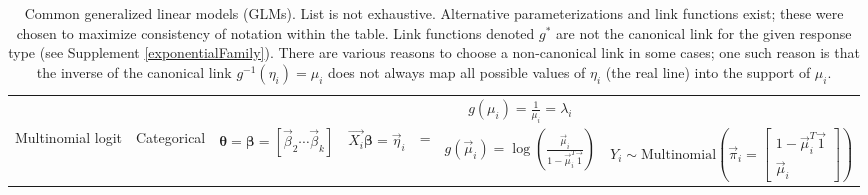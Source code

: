 \documentclass[11pt]{article}
\begin{document}
\begin{sidewaystable}[!htbp]
\begin{tabular}{lcccccc}
	& & & & & $g(\mu_i) = \frac{1}{\mu_i} = \lambda_i$ \\
	
Multinomial logit &
	Categorical & 
	$\bm{\theta}=\bm\beta=\left[\vec\beta_2 \cdots \vec\beta_k\right]$ &
	$\vec{X_i}\bm{\beta} = \vec\eta_i$ & 
	= &
	$g(\vec\mu_i) = \log\left(\frac{\vec{\mu}_i}{1 - \vec\mu_i^T\vec{1}}\right)$ &
	$Y_i \sim \text{Multinomial}\left(\vec\pi_i = \begin{bmatrix} 1 - \vec\mu_i^T \vec{1} \\ \vec\mu_i\end{bmatrix}\right)$ \\

	
	
	
\hline
\end{tabular}
\caption{Common generalized linear models (GLMs). List is not exhaustive. Alternative parameterizations and link functions exist; these were chosen to maximize consistency of notation within the table. Link functions denoted $g^*$ are not the canonical link for the given response type (see Supplement \ref{exponentialFamily}). There are various reasons to choose a non-canonical link in some cases; one such reason is that the inverse of the canonical link $g^{-1}(\eta_i) = \mu_i$ does not always map all possible values of $\eta_i$ (the real line) into the support of $\mu_i$.}
\label{tbl:GLMs}
\end{sidewaystable}

\newpage
\appendix
\end{document}
